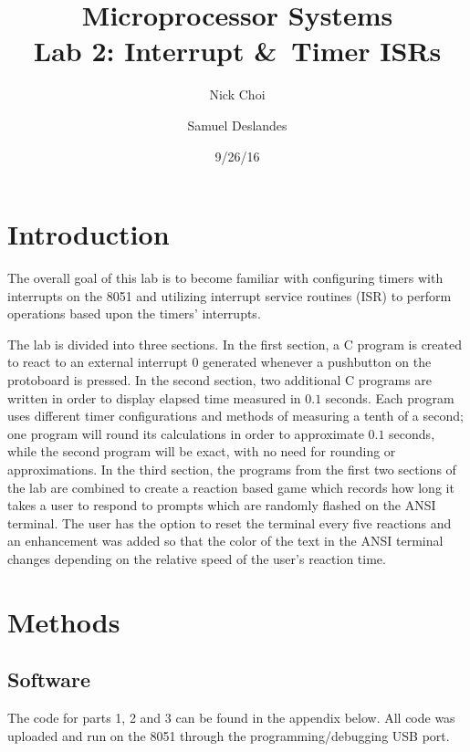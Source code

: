 \documentclass[12pt]{article}
\begin{document}
\title{Microprocessor Systems\\ Lab 2: Interrupt \&\ Timer ISRs}
\author{Nick Choi \and Samuel Deslandes}
\date{9/26/16}
\maketitle
\pagebreak
\section{Introduction}
The overall goal of this lab is to become familiar with configuring timers with interrupts on the 8051 and utilizing interrupt service routines (ISR) to perform operations based upon the timers’ interrupts. 

The lab is divided into three sections. In the first section, a C program is created to react to an external interrupt 0 generated whenever a pushbutton on the protoboard is pressed. In the second section, two additional C programs are written in order to display elapsed time measured in $0.1$ seconds. Each program uses different timer configurations and methods of measuring a tenth of a second; one program will round its calculations in order to approximate $0.1$ seconds, while the second program will be exact, with no need for rounding or approximations. In the third section, the programs from the first two sections of the lab are combined to create a reaction based game which records how long it takes a user to respond to prompts which are randomly flashed on the ANSI terminal. The user has the option to reset the terminal every five reactions and an enhancement was added so that the color of the text in the ANSI terminal changes depending on the relative speed of the user's reaction time. 

\section{Methods}
\subsection{Software}
The code for parts 1, 2 and 3 can be found in the appendix below. All code was uploaded and run on the 8051 through the programming/debugging USB port. 	
\end{document}
